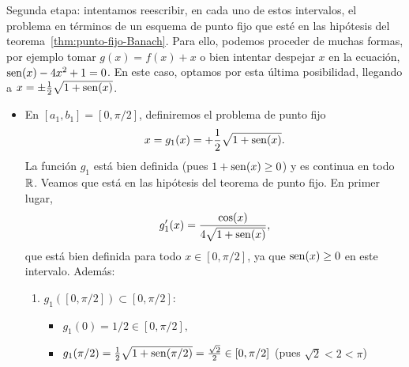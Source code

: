 \begin{example}
  \textsf{Segunda etapa}: intentamos reescribir, en cada uno de estos
  intervalos, el problema en términos de un esquema de punto fijo que
  esté en las hipótesis del teorema~\ref{thm:punto-fijo-Banach}. Para
  ello, podemos proceder de muchas formas, por ejemplo tomar
  $g(x)=f(x)+x$ o bien intentar despejar $x $ en la ecuación,
  $\operatorname{sen}(x)-4x^2+1=0$. En este caso, optamos por esta última
  posibilidad, llegando a $x=\pm \frac 12 \sqrt{1+\operatorname{sen}(x)}$.
  \begin{itemize}
  \item En $[a_1,b_1]=[0, \pi/2]$, definiremos el
    problema de punto fijo
    $$
    x=g_1(x)=+\dfrac 12 \sqrt{1+\operatorname{sen}(x)}.
    $$
    La función $g_1$ está bien definida (pues $1+\operatorname{sen}(x)\ge 0$) y es
    continua en todo $\operatorname{{\mathbb R}}$. Veamos que está en las hipótesis del
    teorema de punto fijo. En primer lugar,
    \begin{equation}
      g_1'(x)=\frac{\cos(x)}{4\sqrt{1+\operatorname{sen}(x)}},
      \label{eq:6}
    \end{equation}
    que está bien definida para todo $x\in[0, \pi/2]$, ya que
    $\operatorname{sen}(x)\ge 0$ en este intervalo. Además:
    \begin{enumerate}
    \item $g_1([0,\pi/2])\subset [0,\pi/2]$:
      \begin{itemize}
      \item $g_1(0)=1/2 \in [0, \pi/2],$
      \item $g_1(\pi/2)= \frac12 \sqrt{1+\operatorname{sen}(\pi/2)}=\frac{\sqrt 2}2 \in
        [0, \pi/2]$ (pues $\sqrt 2 < 2 < \pi$)


\end{itemize}
\end{enumerate}
\end{itemize}
\end{example}
